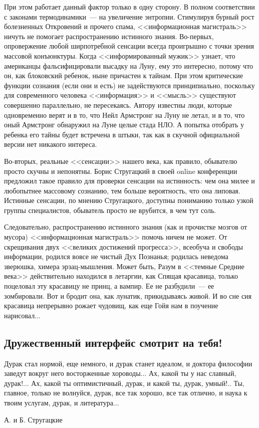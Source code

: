 \documentclass{scrbook}
\makeatletter
\newcommand{\defaultepigraphwidth}{0.5} %
\newcommand{\flqq}{<<}
\newcommand{\frqq}{>>}
\newcommand{\mdash}{~--- }
\newcommand{\essaysection}[1]{\subsection*{#1}\nopagebreak}
\newcommand{\myepigraph}[3][\@empty]{
	\ifx\@empty#1
		\setlength{\epigraphwidth}{\defaultepigraphwidth\textwidth}
	\else
		\setlength{\epigraphwidth}{#1\textwidth}
	\fi
	\epigraph{#2}{#3}
	\setlength{\epigraphwidth}{\defaultepigraphwidth\textwidth} %
	\nopagebreak
}
\makeatother
\begin{document}
При этом работает данный фактор только в одну сторону. В полном соответствии с законами термодинамики{\mdash}на увеличение энтропии. Стимулируя бурный рост болезненных Откровений и прочего спама, {\flqq}информационная магистраль{\frqq} ничуть не помогает распространению истинного знания. Во-первых, опровержение любой ширпотребной сенсации всегда проигрышно с точки зрения массовой конъюнктуры. Когда {\flqq}информированный мужик{\frqq} узнает, что американцы фальсифицировали высадку на Луну, ему это интересно, потому что он, как блоковский ребенок, ныне причастен к тайнам. При этом критические функции сознания (если они и есть) не задействуются принципиально, поскольку для современного человека {\flqq}информация{\frqq} и {\flqq}мысль{\frqq} существуют совершенно параллельно, не пересекаясь. Автору известны люди, которые одновременно верят и в то, что Нейл Армстронг на Луну не летал, и в то, что оный Армстронг обнаружил на Луне целые стада НЛО. А попытка отобрать у ребенка его тайны будет встречена в штыки, так как в скучной официальной версии нет никакого интереса.

Во-вторых, реальные {\flqq}сенсации{\frqq} нашего века, как правило, обывателю просто скучны и непонятны. Борис Стругацкий в своей online конференции предложил такое правило для проверки сенсации на истинность: чем она милее и любопытнее массовому сознанию, тем больше вероятность, что она липовая. Истинные сенсации, по мнению Стругацкого, доступны пониманию только узкой группы специалистов, обыватель просто не врубится, в чем тут соль.

Следовательно, распространению истинного знания (как и прочистке мозгов от мусора) {\flqq}информационная магистраль{\frqq} помочь ничем не может. От скрещивания двух {\flqq}великих достижений прогресса{\frqq}, всеобуча и свободы информации, родился вовсе не чистый Дух Познанья; родилась неведома зверюшка, химера эрзац-мышления. Может быть, Разум в {\flqq}темные Средние века{\frqq} действительно находился в летаргии, как Спящая красавица, только поцеловал эту красавицу не принц, а вампир. Ее не разбудили{\mdash}ее зомбировали. Вот и бродит она, как лунатик, прикидываясь живой. И во сне сия красавица непрерывно рожает чудовищ, как еще Гойя нам в поучение нарисовал...

\essaysection{Дружественный интерфейс смотрит на тебя!}

\myepigraph{Дурак стал нормой, еще немного, и дурак станет идеалом, и доктора философии заведут вокруг него восторженные хороводы... Ах, какой ты у нас славный, дурак!... Ах, какой ты оптимистичный, дурак, и какой ты, дурак, умный!.. Ты, главное, только не волнуйся, дурак, все так хорошо, все так отлично, и наука к твоим услугам, дурак, и литература...}
{А. и Б. Стругацкие}
\end{document}
